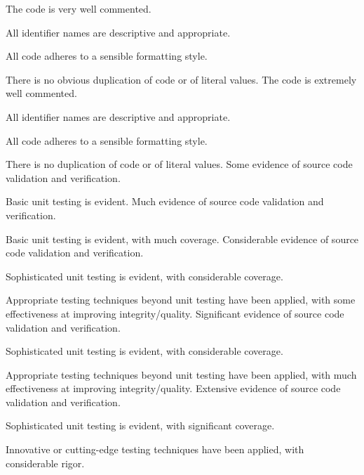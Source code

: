 \begin{markingrubric}
        \grade The code is very well commented.
            \par All identifier names are descriptive and appropriate.
            \par All code adheres to a sensible formatting style.
             \par There is no obvious duplication of code or of literal values.
        \grade The code is extremely well commented.
            \par All identifier names are descriptive and appropriate.
            \par All code adheres to a sensible formatting style.
            \par There is no duplication of code or of literal values.
%
        \grade \fail 
        \grade Some evidence of source code validation and verification.
            \par Basic unit testing is evident.       
        \grade Much evidence of source code validation and verification.
            \par Basic unit testing is evident, with much coverage.
        \grade Considerable evidence of source code validation and verification.
            \par Sophisticated unit testing is evident, with considerable coverage.
            \par Appropriate testing techniques beyond unit testing have been applied, with some effectiveness at improving integrity/quality.
        \grade Significant evidence of source code validation and verification.
            \par Sophisticated unit testing is evident, with considerable coverage.
            \par Appropriate testing techniques beyond unit testing have been applied, with much effectiveness at improving integrity/quality.
        \grade Extensive evidence of source code validation and verification.
            \par Sophisticated unit testing is evident, with significant coverage.
            \par Innovative or cutting-edge testing techniques have been applied, with considerable rigor.
            
\end{markingrubric}

